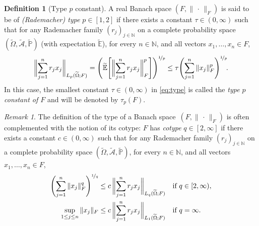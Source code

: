 \documentclass[reqno]{amsart}
\numberwithin{equation}{section}
\newcommand{\bbE}{\mathbb{E}}
\newcommand{\bbN}{\mathbb{N}}
\newcommand{\bbP}{\mathbb{P}}
\newcommand{\cA}{\mathcal{A}}
\newcommand{\Omegat}{\widetilde{\Omega}}
\newcommand{\cAt}{\widetilde{\cA}}
\newcommand{\bbPt}{\widetilde{\bbP}}
\newcommand{\bbEt}{\widetilde{\bbE}}
\newcommand{\norm}[2]{     \| #1       \|_{ #2 }}
\theoremstyle{remark}
\newtheorem{remark}[lemma]{Remark}
\theoremstyle{definition}
\newtheorem{definition}[lemma]{Definition}
\begin{document}
\begin{definition}[Type $p$ constant]\label{def:type-p-constant}
	A real Banach space $(F,\norm{\,\cdot\,}{F})$ 
	is said to be of \emph{(Rademacher) type} $p\in[1,2]$ 
	if there exists a constant $\tau\in(0,\infty)$ 
	such that 
	for any Rademacher family $(r_j)_{j\in\bbN}$ 
	on a complete probability space 
	$(\Omegat,\cAt,\bbPt)$ 
	(with expectation $\bbEt$), 
	for every $n\in\bbN$, 
	and all vectors $x_1,\ldots,x_n\in F$, 
	\begin{equation}\label{eq:type} 
	\biggl\| 
	\sum_{j=1}^n r_j x_j 
	\biggr\|_{L_p(\Omegat;F)}  
	=
	\Biggl( 
	\bbEt   
	\Biggl[ 
	\biggl\|
	\sum_{j=1}^n r_j x_j 
	\biggr\|_F^p 
	\Biggr] 
	\Biggr)^{\nicefrac{1}{p}} 
	\leq 
	\tau 
	\Biggl( 
	\sum_{j=1}^n \norm{x_j}{F}^p 
	\Biggr)^{\nicefrac{1}{p}} \!. 
	\end{equation} 
	In this case, the smallest constant $\tau\in(0,\infty)$ 
	in \eqref{eq:type} 
	is called the \emph{type $p$ constant of $F$} 
	and will be denoted by $\tau_p(F)$. 
\end{definition}

\begin{remark}
	The definition of the type of a Banach space~$(F,\norm{\,\cdot\,}{F})$
	is often complemented with the notion of 
	its cotype: 
	$F$ has \emph{cotype} $q\in[2,\infty]$ 
	if there exists a constant $c\in(0,\infty)$ 
	such that 
	for any Rademacher family $(r_j)_{j\in\bbN}$ 
	on a complete probability space $(\Omegat,\cAt,\bbPt)$, 
	for every $n\in\bbN$, 
	and all vectors $x_1,\ldots,x_n\in F$, 
	\begin{align*}
	\qquad\quad
	\Biggl( 
	\sum_{j=1}^n \norm{x_j}{F}^q 
	\Biggr)^{\nicefrac{1}{q}} 
	&\leq 
	c \, 
	\biggl\| 
	\sum_{j=1}^n r_j x_j 
	\biggr\|_{L_q(\Omegat;F)} 
	&&
	\text{if } q \in [2,\infty), 
	\qquad\quad
	\\
	\sup_{1\leq j \leq n} 
	\norm{x_j}{F}
	&\leq 
	c \, 
	\biggl\| 
	\sum_{j=1}^n r_j x_j 
	\biggr\|_{L_1(\Omegat;F)}  
	&&\text{if } 
	q=\infty. 
	\end{align*} 
\end{remark}  
\end{document}
